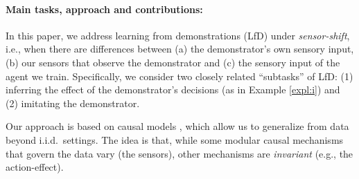 \documentclass[letterpaper]{article} %
\theoremstyle{definition}%
\theoremstyle{definition}
\begin{document}
\paragraph{Main tasks, approach and contributions:}
In this paper, we address learning from demonstrations (LfD) under \emph{sensor-shift}, i.e., when %
there are differences between (a)  the demonstrator's own sensory input, (b) our sensors that observe the demonstrator and (c) the sensory input of the agent we train.
Specifically, we consider two closely related ``subtasks'' of LfD: (1) inferring the effect of the demonstrator's decisions (as in Example \ref{expl:i}) and (2) imitating the demonstrator.
%

Our approach is based on causal models \cite{pearl2009causality,spirtes2000causation,peters2017elements}, which allow us to generalize from data beyond i.i.d.\ settings.
The idea is that, while some modular causal mechanisms that govern the data vary (the sensors), other mechanisms are \emph{invariant} (e.g., the action-effect). %
\end{document}

